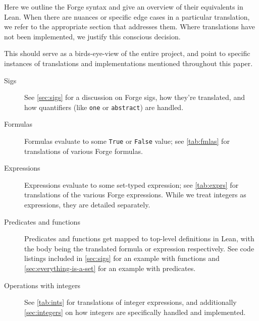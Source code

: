Here we outline the Forge syntax and give an overview of their equivalents in Lean. When there are nuances or specific edge cases in a particular translation, we refer to the appropriate section that addresses them. Where translations have not been implemented, we justify this conscious decision. 

This should serve as a birds-eye-view of the entire project, and point to specific instances of translations and implementations mentioned throughout this paper. 

\begin{description}
  \item[Sigs] See \cref{sec:sigs} for a discussion on Forge sigs, how they're translated, and how quantifiers (like \texttt{one} or \texttt{abstract}) are handled.
  \item[Formulas] Formulas evaluate to some \texttt{True} or \texttt{False} value; see \cref{tab:fmlas} for translations of various Forge formulas.
  \item[Expressions] Expressions evaluate to some set-typed expression; see \cref{tab:exprs} for translations of the various Forge expressions. While we treat integers as expressions, they are detailed separately. 
  \item[Predicates and functions] Predicates and functions get mapped to top-level definitions in Lean, with the body being the translated formula or expression respectively. See code listings included in \cref{sec:sigs} for an example with functions and \cref{sec:everything-is-a-set} for an example with predicates. 
  \item[Operations with integers] See \cref{tab:ints} for translations of integer expressions, and additionally \cref{sec:integers} on how integers are specifically handled and implemented. 
\end{description}


